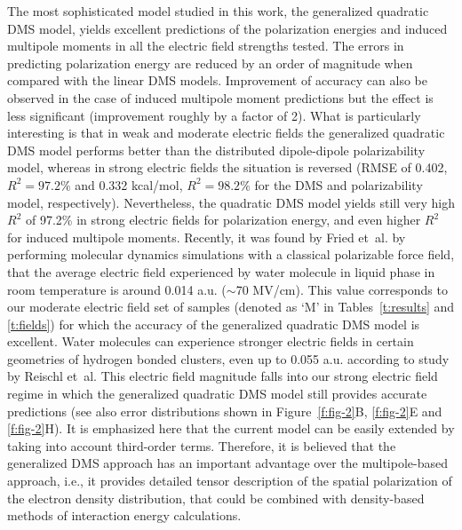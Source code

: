 \documentclass[aip,amsmath,amssymb,reprint,floatfix]{revtex4-1}
\begin{document}
The most sophisticated model studied in this work, the generalized quadratic DMS model, yields excellent predictions 
of the polarization energies and induced multipole moments in all the electric field strengths tested.
The errors in predicting polarization energy are reduced by an order of magnitude when compared with
the linear DMS models. Improvement of accuracy can also be observed in the case of induced multipole moment predictions
but the effect is less significant (improvement roughly by a factor of 2).
What is particularly interesting is that in weak and moderate electric fields
the generalized quadratic DMS model performs better than the distributed dipole\hyp{}dipole
polarizability model, whereas in strong electric fields the situation is reversed
(RMSE of 0.402, $R^2=97.2\%$ and 0.332 kcal/mol, $R^2=98.2\%$ for the DMS and polarizability model, respectively).
Nevertheless, the quadratic DMS model yields still very high $R^2$ of 97.2\% in strong electric fields for polarization
energy, and even higher $R^2$ for induced multipole moments.
Recently, it was found by Fried et~al. by performing molecular dynamics simulations with a classical 
polarizable force field, that the average electric field experienced by water molecule in liquid phase
in room temperature is around 0.014 a.u. ($\sim$70 MV/cm).\cite{Fried.Wang.Boxer.Ren.Pande.JPCB.2013}
This value corresponds to our moderate electric field set of samples (denoted as `M' in Tables~\ref{t:results}
and \ref{t:fields}) for which the
accuracy of the generalized quadratic DMS model is excellent.
Water molecules can experience
stronger electric fields in certain geometries of hydrogen bonded clusters, 
even up to 0.055 a.u. according to study by Reischl et~al.\cite{Reischl.Kofinger.Dellago.MolPhys.2009} 
This electric field magnitude falls into our strong electric field regime in which the generalized quadratic
DMS model still provides accurate predictions (see also error distributions 
shown in Figure~\ref{f:fig-2}B, \ref{f:fig-2}E and \ref{f:fig-2}H). 
It is emphasized here that the current model can be easily extended by taking into account
third\hyp{}order terms. 
Therefore, it is believed that
the generalized DMS approach 
has an important advantage over the multipole\hyp{}based approach, i.e., it provides detailed
tensor description of the spatial polarization of the electron density distribution, that could be
combined with density\hyp{}based methods of interaction energy calculations.\cite{Mandado.Hermida-Ramon.JCTC.2011}
\end{document}
